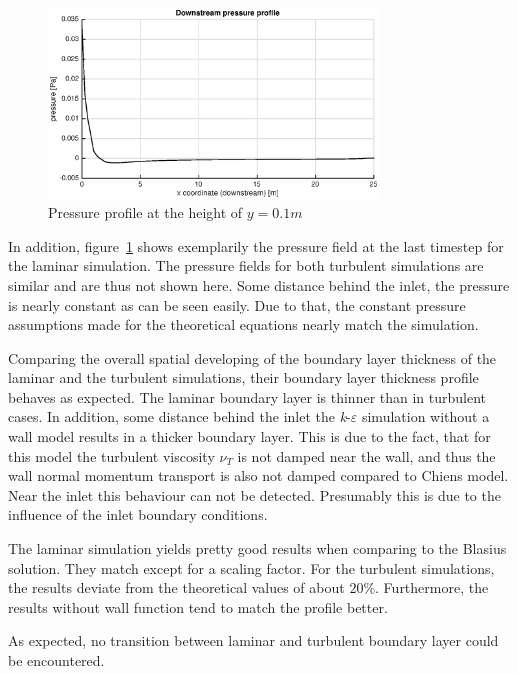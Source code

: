 \begin{figure}[!htb]
\centering
\includegraphics[width=0.78\textwidth]{FIGURES/pressure.eps}
\caption{Pressure profile at the height of $y=0.1m$}
\label{fig:boundarylayerpressure}
\end{figure} 

\noii In addition, figure~\ref{fig:boundarylayerpressure} shows exemplarily the pressure field at the last timestep for the laminar simulation. The pressure fields for both turbulent simulations are similar and are thus not shown here. Some distance behind the inlet, the pressure is nearly constant as can be seen easily. Due to that, the constant pressure assumptions made for the theoretical equations nearly match the simulation.

\noii Comparing the overall spatial developing of the boundary layer thickness of the laminar and the turbulent simulations, their boundary layer thickness profile behaves as expected. The laminar boundary layer is thinner than in turbulent cases. In addition, some distance behind the inlet the \textit{k}-$\varepsilon$ simulation without a wall model results in a thicker boundary layer. This is due to the fact, that for this model the turbulent viscosity $\nu_T$ is not damped near the wall, and thus the wall normal momentum transport is also not damped compared to Chiens model. Near the inlet this behaviour can not be detected. Presumably this is due to the influence of the inlet boundary conditions.

\noii The laminar simulation yields pretty good results when comparing to the Blasius solution. They match except for a scaling factor. For the turbulent simulations, the results deviate from the theoretical values of about $20\%$. Furthermore, the results without wall function tend to match the profile better.

\noii As expected, no transition between laminar and turbulent boundary layer could be encountered.


